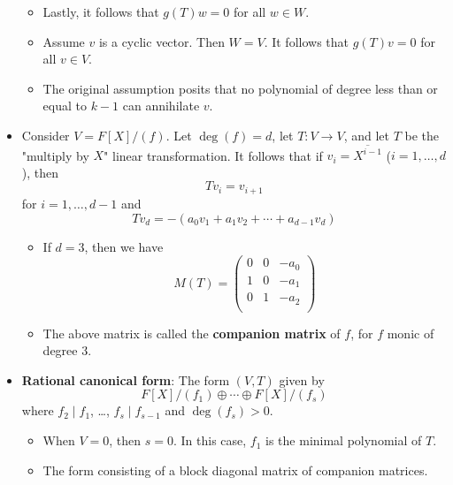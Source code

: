 \documentclass[../notes.tex]{subfiles}
\begin{document}
\begin{itemize}
\begin{itemize}
        \item Lastly, it follows that $g(T)w=0$ for all $w\in W$.
        \item Assume $v$ is a cyclic vector. Then $W=V$. It follows that $g(T)v=0$ for all $v\in V$.
        \item The original assumption posits that no polynomial of degree less than or equal to $k-1$ can annihilate $v$.
    \end{itemize}
    \item Consider $V=F[X]/(f)$. Let $\deg(f)=d$, let $T:V\to V$, and let $T$ be the "multiply by $X$" linear transformation. It follows that if $v_i=\overline{X^{i-1}}$ ($i=1,\dots,d$), then
    \begin{equation*}
        Tv_i = v_{i+1}
    \end{equation*}
    for $i=1,\dots,d-1$ and
    \begin{equation*}
        Tv_d = -(a_0v_1+a_1v_2+\cdots+a_{d-1}v_d)
    \end{equation*}
    \begin{itemize}
        \item If $d=3$, then we have
        \begin{equation*}
            M(T) =
            \begin{pmatrix}
                0 & 0 & -a_0\\
                1 & 0 & -a_1\\
                0 & 1 & -a_2\\
            \end{pmatrix}
        \end{equation*}
        \item The above matrix is called the \textbf{companion matrix} of $f$, for $f$ monic of degree 3.
    \end{itemize}
    \item \textbf{Rational canonical form}: The form $(V,T)$ given by
    \begin{equation*}
        F[X]/(f_1)\oplus\cdots\oplus F[X]/(f_s)
    \end{equation*}
    where $f_2\mid f_1$, \dots, $f_s\mid f_{s-1}$ and $\deg(f_s)>0$.
    \begin{itemize}
        \item When $V=0$, then $s=0$. In this case, $f_1$ is the minimal polynomial of $T$.
        \item The form consisting of a block diagonal matrix of companion matrices.
    \end{itemize}

\end{itemize}
\end{document}
